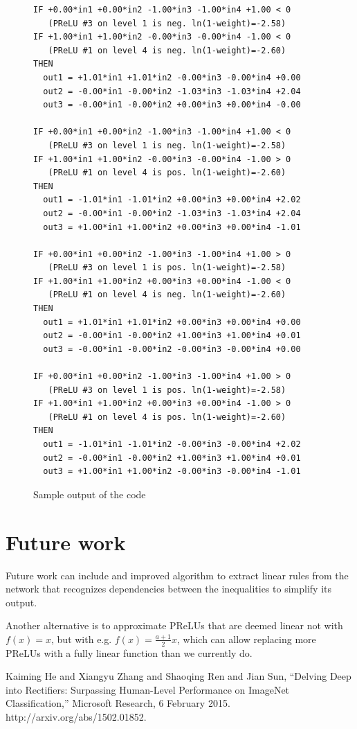 \documentclass{article}[12pt]
\begin{document}
\begin{figure}[ht]
\begin{verbatim}
IF +0.00*in1 +0.00*in2 -1.00*in3 -1.00*in4 +1.00 < 0
   (PReLU #3 on level 1 is neg. ln(1-weight)=-2.58)  
IF +1.00*in1 +1.00*in2 -0.00*in3 -0.00*in4 -1.00 < 0
   (PReLU #1 on level 4 is neg. ln(1-weight)=-2.60)  
THEN    
  out1 = +1.01*in1 +1.01*in2 -0.00*in3 -0.00*in4 +0.00  
  out2 = -0.00*in1 -0.00*in2 -1.03*in3 -1.03*in4 +2.04  
  out3 = -0.00*in1 -0.00*in2 +0.00*in3 +0.00*in4 -0.00  
        
IF +0.00*in1 +0.00*in2 -1.00*in3 -1.00*in4 +1.00 < 0
   (PReLU #3 on level 1 is neg. ln(1-weight)=-2.58)  
IF +1.00*in1 +1.00*in2 -0.00*in3 -0.00*in4 -1.00 > 0
   (PReLU #1 on level 4 is pos. ln(1-weight)=-2.60)  
THEN    
  out1 = -1.01*in1 -1.01*in2 +0.00*in3 +0.00*in4 +2.02  
  out2 = -0.00*in1 -0.00*in2 -1.03*in3 -1.03*in4 +2.04  
  out3 = +1.00*in1 +1.00*in2 +0.00*in3 +0.00*in4 -1.01  
        
IF +0.00*in1 +0.00*in2 -1.00*in3 -1.00*in4 +1.00 > 0
   (PReLU #3 on level 1 is pos. ln(1-weight)=-2.58)  
IF +1.00*in1 +1.00*in2 +0.00*in3 +0.00*in4 -1.00 < 0
   (PReLU #1 on level 4 is neg. ln(1-weight)=-2.60)  
THEN    
  out1 = +1.01*in1 +1.01*in2 +0.00*in3 +0.00*in4 +0.00  
  out2 = -0.00*in1 -0.00*in2 +1.00*in3 +1.00*in4 +0.01  
  out3 = -0.00*in1 -0.00*in2 -0.00*in3 -0.00*in4 +0.00  
        
IF +0.00*in1 +0.00*in2 -1.00*in3 -1.00*in4 +1.00 > 0
   (PReLU #3 on level 1 is pos. ln(1-weight)=-2.58)  
IF +1.00*in1 +1.00*in2 +0.00*in3 +0.00*in4 -1.00 > 0
   (PReLU #1 on level 4 is pos. ln(1-weight)=-2.60)  
THEN    
  out1 = -1.01*in1 -1.01*in2 -0.00*in3 -0.00*in4 +2.02  
  out2 = -0.00*in1 -0.00*in2 +1.00*in3 +1.00*in4 +0.01  
  out3 = +1.00*in1 +1.00*in2 -0.00*in3 -0.00*in4 -1.01
\end{verbatim}
\caption{Sample output of the code}
\label{output}
\end{figure}

\section{Future work}

Future work can include and improved algorithm to extract linear rules from the network
that recognizes dependencies between the inequalities to simplify its output.

Another alternative is to approximate PReLUs that are deemed linear not with $f(x)=x$,
but with e.g. $f(x)=\frac{a+1}{2}x$, which can allow replacing more PReLUs with a fully linear function than we currently do.

\begin{thebibliography}{99}
Kaiming He and
               Xiangyu Zhang and
               Shaoqing Ren and
               Jian Sun,
``Delving Deep into Rectifiers: Surpassing Human-Level Performance on
               ImageNet Classification,''
Microsoft Research,
6 February 2015.
http://arxiv.org/abs/1502.01852.
\end{thebibliography}
\end{document}
